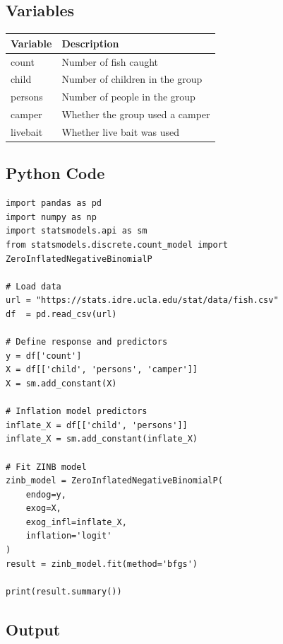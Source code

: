 \documentclass[12pt,a4paper]{article}
\begin{document}
\subsection{Variables}
\begin{center}
\begin{tabular}{ll}
\toprule
Variable  & Description \\
\midrule
count    & Number of fish caught \\
child    & Number of children in the group \\
persons  & Number of people in the group \\
camper   & Whether the group used a camper \\
livebait & Whether live bait was used \\
\bottomrule
\end{tabular}
\end{center}

\subsection{Python Code}

\begin{lstlisting}
import pandas as pd
import numpy as np
import statsmodels.api as sm
from statsmodels.discrete.count_model import ZeroInflatedNegativeBinomialP

# Load data
url = "https://stats.idre.ucla.edu/stat/data/fish.csv"
df  = pd.read_csv(url)

# Define response and predictors
y = df['count']
X = df[['child', 'persons', 'camper']]
X = sm.add_constant(X)

# Inflation model predictors
inflate_X = df[['child', 'persons']]
inflate_X = sm.add_constant(inflate_X)

# Fit ZINB model
zinb_model = ZeroInflatedNegativeBinomialP(
    endog=y,
    exog=X,
    exog_infl=inflate_X,
    inflation='logit'
)
result = zinb_model.fit(method='bfgs')

print(result.summary())
\end{lstlisting}

\subsection{Output}
\end{document}
